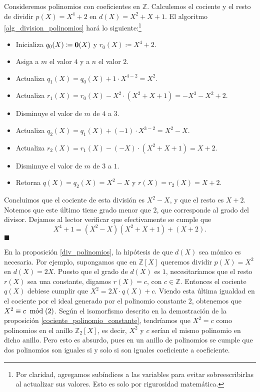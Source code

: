 \begin{example} \label{ejemplo_division_polinomios}
Consideremos polinomios con coeficientes en $\mathbb{Z}$. Calculemos el cociente y el resto de dividir $p(X) = X^4+2$ en $d(X) = X^2+X+1$. El algoritmo \ref{alg_division_polinomios} hará lo siguiente:\footnote{Por claridad, agregamos subíndices a las variables para evitar sobreescribirlas al actualizar sus valores. Esto es solo por rigurosidad matemática.}
\begin{itemize}
\item Inicializa $q_0(X) \coloneqq \0(X)$ y $r_0(X) \coloneqq X^4+2$.
\item Asiga a $m$ el valor $4$ y a $n$ el valor $2$.
\item Actualiza $q_1(X) = q_0(X) + 1 \cdot X^{4-2} = X^2$.
\item Actualiza $r_1(X) = r_0(X) - X^2 \cdot (X^2+X+1) = -X^3 - X^2 + 2$.
\item Disminuye el valor de $m$ de $4$ a $3$.
\item Actualiza $q_2(X) = q_1(X) + (-1) \cdot X^{3-2} = X^2 - X$.
\item Actualiza $r_2(X) = r_1(X) - (-X) \cdot (X^2+X+1) = X + 2$.
\item Disminuye el valor de $m$ de $3$ a $1$.
\item Retorna $q(X) = q_2(X) = X^2-X$ y $r(X) = r_2(X) = X+2$.
\end{itemize}
Concluimos que el cociente de esta división es $X^2-X$, y que el resto es $X+2$. Notemos que este último tiene grado menor que $2$, que corresponde al grado del divisor. Dejamos al lector verificar que efectivamente se cumple que
$$X^4+1 = (X^2-X)(X^2+X+1) + (X+2).$$
\hfill$\blacksquare$
\end{example}

En la proposición \ref{div_polinomios}, la hipótesis de que $d(X)$ sea mónico es necesaria. Por ejemplo, supongamos que en $\mathbb{Z}[X]$ queremos dividir $p(X) = X^2$ en $d(X) = 2X$. Puesto que el grado de $d(X)$ es $1$, necesitaríamos que el resto $r(X)$ sea una constante, digamos $r(X) = c$, con $c \in \mathbb{Z}$. Entonces el cociente $q(X)$ debiese cumplir que
$X^2 = 2X \cdot q(X) + c$. Viendo esta última igualdad en el cociente por el ideal generado por el polinomio constante $2$, obtenemos que $X^2 \equiv c \modu (2)$. Según el isomorfismo descrito en la demostración de la proposición \ref{cociente_polinomio_constante}, tendríamos que $X^2 = c$ como polinomios en el anillo $\mathbb{Z}_2[X]$, es decir, $X^2$ y $c$ serían el mismo polinomio en dicho anillo. Pero esto es absurdo, pues en un anillo de polinomios se cumple que dos polinomios son iguales si y solo si son iguales coeficiente a coeficiente.